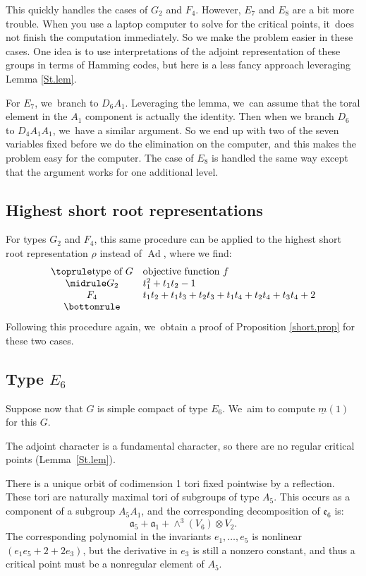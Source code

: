 \documentclass[JEP,XML,SOM,Unicode,NoFloatCountersInSection,published]{cedram}
\theoremstyle{definition}
\newcommand{\mfa}{\mathfrak{a}}
\newcommand{\mfe}{\mathfrak{e}}
\newcommand{\mmin}{\underline{m}}
\DeclareMathOperator{\Ad}{Ad}
\begin{document}
This quickly handles the cases of $G_2$ and $F_4$. However, $E_7$ and $E_8$ are a bit more trouble. When you use a laptop computer to solve for the critical points, it~does not finish the computation immediately. So we make the problem easier in these cases. One idea is to use interpretations of the adjoint representation of these groups in terms of Hamming codes, but here is a less fancy approach leveraging Lemma \ref{St.lem}.

For $E_7$, we~branch to $D_6 A_1$. Leveraging the lemma, we~can assume that the toral element in the $A_1$ component is actually the identity. Then when we branch $D_6$ to $D_4 A_1 A_1$, we~have a similar argument. So we end up with two of the seven variables fixed before we do the elimination on the computer, and this makes the problem easy for the computer. The case of $E_8$ is handled the same way except that the argument works for one additional level.

\subsection*{Highest short root representations}
For types $G_2$ and $F_4$, this same procedure can be applied to the highest short root representation $\rho$ instead of $\Ad$, where we find:
\[
\begin{array}{cl} \toprule
\text{type of $G$}&\text{objective function $f$} \\ \midrule
G_2& t_1^2 + t_1 t_2 - 1\\
F_4& t_1 t_2 + t_1 t_3 + t_2 t_3 + t_1 t_4 + t_2 t_4 + t_3 t_4 + 2 \\ \bottomrule
\end{array}
\]
Following this procedure again, we~obtain a proof of Proposition \ref{short.prop} for these two cases.

\subsection*{Type \texorpdfstring{$E_6$}{E6}}
Suppose now that $G$ is simple compact of type $E_6$. We~aim to compute $\mmin(1)$ for this $G$.

The adjoint character is a fundamental character, so there
are no regular critical points (Lemma~\ref{St.lem}).

There is a unique orbit of codimension 1 tori fixed pointwise by a reflection. These tori are
naturally maximal tori of subgroups of type $A_5$. This occurs as
a component of a subgroup $A_5A_1$, and the corresponding
decomposition of $\mfe_6$ is:
\[
\mfa_5+\mfa_1+\wedge^3(V_6)\otimes V_2.
\]
The corresponding polynomial in the invariants $e_1,\ldots,e_5$ is nonlinear
$(e_1e_5+2+2e_3)$, but the derivative in $e_3$ is still a nonzero constant, and
thus a critical point must be a nonregular element of $A_5$.
\end{document}
